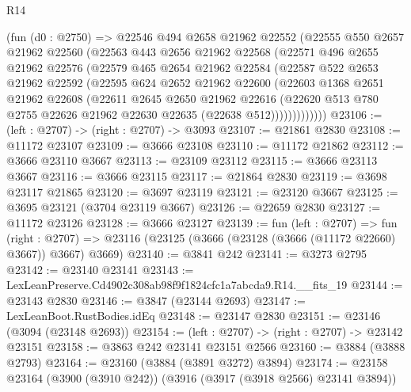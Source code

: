 \begin{lexlean}{R14}
\begin{coremodule}
        (fun (d0 : @2750) =>
        @22546
          @494
          @2658
          @21962
          @22552
          (@22555
            @550
            @2657
            @21962
            @22560
            (@22563
              @443
              @2656
              @21962
              @22568
              (@22571
                @496
                @2655
                @21962
                @22576
                (@22579
                  @465
                  @2654
                  @21962
                  @22584
                  (@22587
                    @522
                    @2653
                    @21962
                    @22592
                    (@22595
                      @624
                      @2652
                      @21962
                      @22600
                      (@22603
                        @1368
                        @2651
                        @21962
                        @22608
                        (@22611
                          @2645
                          @2650
                          @21962
                          @22616
                          (@22620
                            @513
                            @780
                            @2755
                            @22626
                            @21962
                            @22630
                            @22635
                            (@22638 @512)))))))))))))
@23106 := (left : @2707) -> (right : @2707) -> @3093
@23107 := @21861 @2830
@23108 := @11172 @23107
@23109 := @3666 @23108
@23110 := @11172 @21862
@23112 := @3666 @23110 @3667
@23113 := @23109 @23112
@23115 := @3666 @23113 @3667
@23116 := @3666 @23115
@23117 := @21864 @2830
@23119 := @3698 @23117 @21865
@23120 := @3697 @23119
@23121 := @23120 @3667
@23125 := @3695 @23121 (@3704 @23119 @3667)
@23126 := @22659 @2830
@23127 := @11172 @23126
@23128 := @3666 @23127
@23139 := fun (left : @2707) =>
  fun (right : @2707) => @23116 (@23125 (@3666 (@23128 (@3666 (@11172 @22660) @3667)) @3667) @3669)
@23140 := @3841 @242
@23141 := @3273 @2795
@23142 := @23140 @23141
@23143 := LexLeanPreserve.Cd4902c308ab98f9f1824cfc1a7abcda9.R14.__fits_19
@23144 := @23143 @2830
@23146 := @3847 (@23144 @2693)
@23147 := LexLeanBoot.RustBodies.idEq
@23148 := @23147 @2830
@23151 := @23146 (@3094 (@23148 @2693))
@23154 := (left : @2707) -> (right : @2707) -> @23142 @23151
@23158 := @3863 @242 @23141 @23151 @2566
@23160 := @3884 (@3888 @2793)
@23164 := @23160 (@3884 (@3891 @3272) @3894)
@23174 := @23158 @23164 (@3900 (@3910 @242)) (@3916 (@3917 (@3918 @2566) @23141 @3894))

\end{coremodule}
\end{lexlean}
